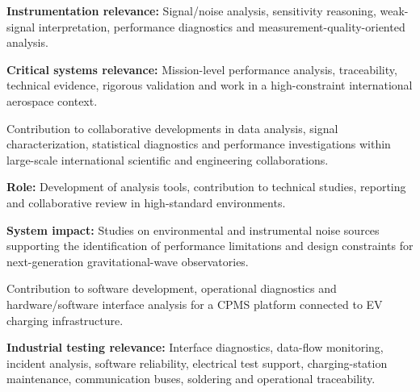 \documentclass[8pt,a4paper,ragged2e,withhyper]{altacv}
\begin{document}
\textbf{Instrumentation relevance:} Signal/noise analysis, sensitivity reasoning, weak-signal interpretation, performance diagnostics and measurement-quality-oriented analysis.

\textbf{Critical systems relevance:} Mission-level performance analysis, traceability, technical evidence, rigorous validation and work in a high-constraint international aerospace context.

\divider


Contribution to collaborative developments in data analysis, signal characterization, statistical diagnostics and performance investigations within large-scale international scientific and engineering collaborations.

\textbf{Role:} Development of analysis tools, contribution to technical studies, reporting and collaborative review in high-standard environments.

\textbf{System impact:} Studies on environmental and instrumental noise sources supporting the identification of performance limitations and design constraints for next-generation gravitational-wave observatories.

\divider


Contribution to software development, operational diagnostics and hardware/software interface analysis for a CPMS platform connected to EV charging infrastructure.

\textbf{Industrial testing relevance:} Interface diagnostics, data-flow monitoring, incident analysis, software reliability, electrical test support, charging-station maintenance, communication buses, soldering and operational traceability.


\vspace{-.3cm}


{\small
{}
\newline
{}
}
\end{document}
